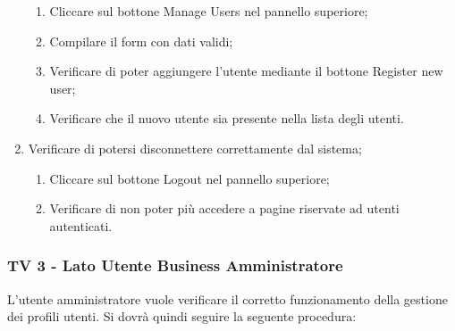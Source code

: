 \begin{enumerate}
\begin{enumerate}
\item Cliccare sul bottone Manage Users nel pannello superiore;
\item Compilare il form con dati validi;
\item Verificare di poter aggiungere l'utente mediante il bottone Register new user;
\item Verificare che il nuovo utente sia presente nella lista degli utenti. 
\end{enumerate}
\item Verificare di potersi disconnettere correttamente dal sistema;
\begin{enumerate}
\item Cliccare sul bottone Logout nel pannello superiore;
\item Verificare di non poter più accedere a pagine riservate ad utenti autenticati.
\end{enumerate}
\end{enumerate}

\subsubsection{TV 3 - Lato Utente Business Amministratore}

L'utente amministratore vuole verificare il corretto funzionamento della gestione dei profili utenti.
Si dovrà quindi seguire la seguente procedura:

